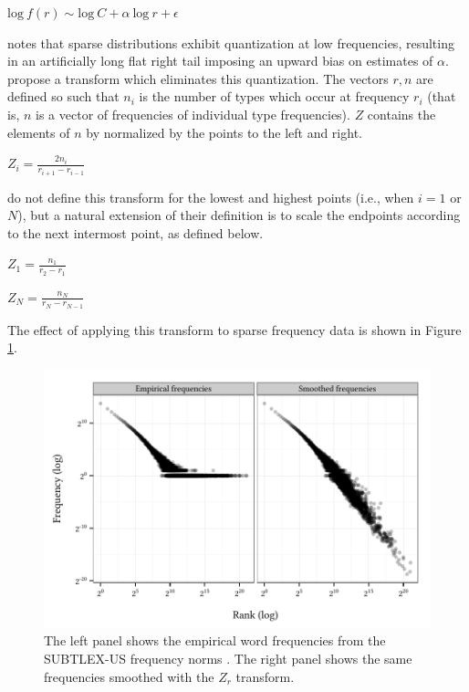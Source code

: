 \documentclass[12pt]{article}
\begin{document}
\begin{unlabeledexample} 
$\displaystyle \textrm{log}~f(r) \sim \textrm{log}~C + \alpha~\textrm{log}~r + \epsilon$  
\end{unlabeledexample}

\citet{Good1953} notes that sparse distributions exhibit quantization at low frequencies, resulting in an artificially long flat right tail imposing an upward bias on estimates of $\alpha$. \citet[][29]{Church1991} propose a transform which eliminates this quantization. The vectors $r, n$ are defined so such that $n_i$ is the number of types which occur at frequency $r_i$ (that is, $n$ is a vector of frequencies of individual type frequencies). $Z$ contains the elements of $n$ by normalized by the points to the left and right.

\begin{unlabeledexample}
$\displaystyle Z_i = \frac{2 n_i}{r_{i + 1} - r_{i - 1}}$
\end{unlabeledexample}

\noindent \citeauthor{Church1991} do not define this transform for the lowest and highest points (i.e., when $i = 1$ or $N$), but a natural extension of their definition is to scale the endpoints according to the next intermost point, as defined below.

\begin{unlabeledexample}
$\displaystyle Z_1 = \frac{n_1}{r_2 - r_1}$
\end{unlabeledexample}

\begin{unlabeledexample}
$\displaystyle Z_N = \frac{n_N}{r_N - r_{N - 1}}$
\end{unlabeledexample}

\noindent The effect of applying this transform to sparse frequency data is shown in Figure \ref{subtlex}.

\begin{figure}
\centering
\includegraphics{zr.pdf}
\caption{The left panel shows the empirical word frequencies from the SUBTLEX-US frequency norms \citep{Brysbaert2009}. The right panel shows the same frequencies smoothed with the $Z_r$ transform.}
\label{subtlex}
\end{figure}



\end{document}

